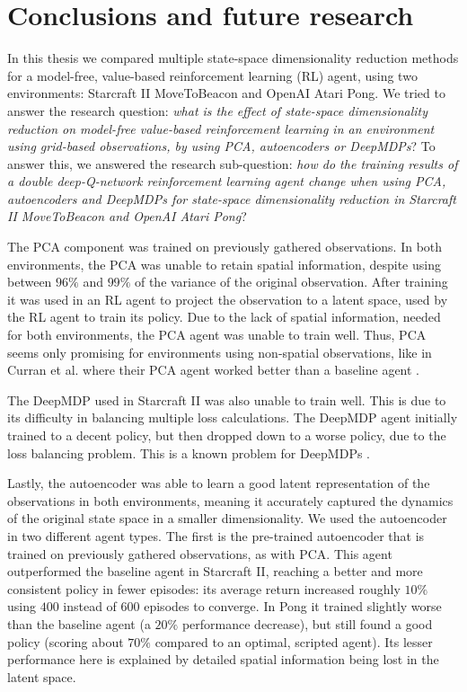 \chapter{Conclusions and future research}\label{conclusions}
In this thesis we compared multiple state-space dimensionality reduction methods for a model-free, value-based reinforcement learning (RL) agent, using two environments: Starcraft II MoveToBeacon and OpenAI Atari Pong. We tried to answer the research question: \textit{what is the effect of state-space dimensionality reduction on model-free value-based reinforcement learning in an environment using grid-based observations, by using PCA, autoencoders or DeepMDPs}? To answer this, we answered the research sub-question: \textit{how do the training results of a double deep-Q-network reinforcement learning agent change when using PCA, autoencoders and DeepMDPs for state-space dimensionality reduction in Starcraft II MoveToBeacon and OpenAI Atari Pong}? 

The PCA component was trained on previously gathered observations. In both environments, the PCA was unable to retain spatial information, despite using between $96\%$ and $99\%$ of the variance of the original observation. After training it was used in an RL agent to project the observation to a latent space, used by the RL agent to train its policy. Due to the lack of spatial information, needed for both environments, the PCA agent was unable to train well. Thus, PCA seems only promising for environments using non-spatial observations, like in Curran et al. where their PCA agent worked better than a baseline agent \cite{mario}.

The DeepMDP used in Starcraft II was also unable to train well. This is due to its difficulty in balancing multiple loss calculations. The DeepMDP agent initially trained to a decent policy, but then dropped down to a worse policy, due to the loss balancing problem. This is a known problem for DeepMDPs \cite{deepmdp}.

Lastly, the autoencoder was able to learn a good latent representation of the observations in both environments, meaning it accurately captured the dynamics of the original state space in a smaller dimensionality. We used the autoencoder in two different agent types. The first is the pre-trained autoencoder that is trained on previously gathered observations, as with PCA. This agent outperformed the baseline agent in Starcraft II, reaching a better and more consistent policy in fewer episodes: its average return increased roughly $10\%$ using $400$ instead of $600$ episodes to converge. In Pong it trained slightly worse than the baseline agent (a $20\%$ performance decrease), but still found a good policy (scoring about $70\%$ compared to an optimal, scripted agent). Its lesser performance here is explained by detailed spatial information being lost in the latent space.

